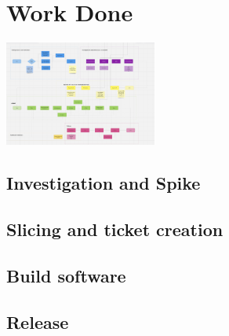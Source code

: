 \section{Work Done}

\includegraphics[width=5cm]{assets/fullWorkflow.png}

  \subsection{Investigation and Spike}

  \subsection{Slicing and ticket creation}

  \subsection{Build software}

  \subsection{Release}

\newpage
